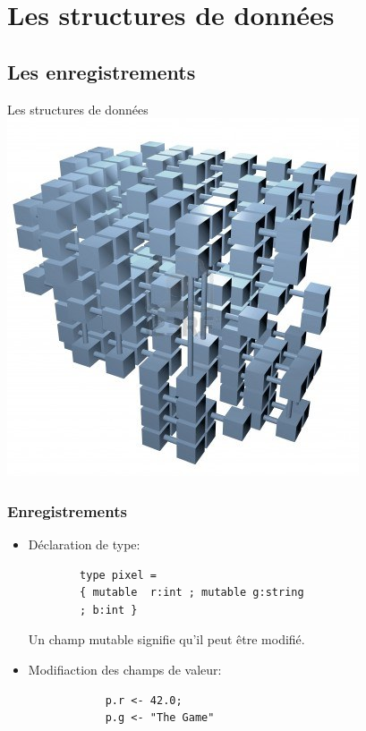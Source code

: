 
\section{Les structures de données}
\subsection{Les enregistrements}

\begin{frame}
	\begin{center}
		\huge  Les structures de données
		\includegraphics[scale=0.6]{pics/struct.jpg}
	\end{center}
\end{frame}


\begin{frame}[fragile]
	\frametitle{Enregistrements}
	\begin{itemize}
	\item Déclaration de type: 
		\begin{lstlisting}
		type pixel = 
		{ mutable  r:int ; mutable g:string 
		; b:int } 
		\end{lstlisting}
		Un champ mutable signifie qu'il peut être modifié.
	
	\item Modifiaction des champs de valeur:
		\begin{lstlisting}
			p.r <- 42.0;
			p.g <- "The Game"
		\end{lstlisting}
\end{itemize}
\end{frame}



